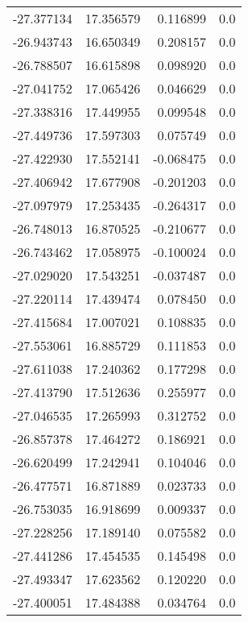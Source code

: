 \begin{tabular}{rrrr}
      -27.377134 &        17.356579 &    0.116899 &   0.0 \\
      -26.943743 &        16.650349 &    0.208157 &   0.0 \\
      -26.788507 &        16.615898 &    0.098920 &   0.0 \\
      -27.041752 &        17.065426 &    0.046629 &   0.0 \\
      -27.338316 &        17.449955 &    0.099548 &   0.0 \\
      -27.449736 &        17.597303 &    0.075749 &   0.0 \\
      -27.422930 &        17.552141 &   -0.068475 &   0.0 \\
      -27.406942 &        17.677908 &   -0.201203 &   0.0 \\
      -27.097979 &        17.253435 &   -0.264317 &   0.0 \\
      -26.748013 &        16.870525 &   -0.210677 &   0.0 \\
      -26.743462 &        17.058975 &   -0.100024 &   0.0 \\
      -27.029020 &        17.543251 &   -0.037487 &   0.0 \\
      -27.220114 &        17.439474 &    0.078450 &   0.0 \\
      -27.415684 &        17.007021 &    0.108835 &   0.0 \\
      -27.553061 &        16.885729 &    0.111853 &   0.0 \\
      -27.611038 &        17.240362 &    0.177298 &   0.0 \\
      -27.413790 &        17.512636 &    0.255977 &   0.0 \\
      -27.046535 &        17.265993 &    0.312752 &   0.0 \\
      -26.857378 &        17.464272 &    0.186921 &   0.0 \\
      -26.620499 &        17.242941 &    0.104046 &   0.0 \\
      -26.477571 &        16.871889 &    0.023733 &   0.0 \\
      -26.753035 &        16.918699 &    0.009337 &   0.0 \\
      -27.228256 &        17.189140 &    0.075582 &   0.0 \\
      -27.441286 &        17.454535 &    0.145498 &   0.0 \\
      -27.493347 &        17.623562 &    0.120220 &   0.0 \\
      -27.400051 &        17.484388 &    0.034764 &   0.0 \\

\end{tabular}
